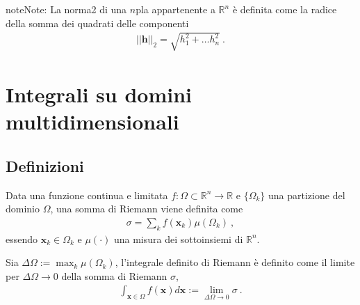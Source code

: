 \documentclass[letterpaper,10pt,english]{jupyterBook}
\begin{document}
\begin{sphinxadmonition}{note}{Note:}
\sphinxAtStartPar
{}
La norma\sphinxhyphen{}2 di una \(n\)\sphinxhyphen{}pla appartenente a \(\mathbb{R}^n\) è definita come la radice della somma dei quadrati delle componenti
\begin{equation*}
\begin{split}||\mathbf{h}||_{2} = \sqrt{h_1^2 + \dots h_n^2} \ .\end{split}
\end{equation*}\end{sphinxadmonition}

\sphinxstepscope


\section{Integrali su domini multi\sphinxhyphen{}dimensionali}
\label{\detokenize{ch/multivariable-calculus/integrals:integrali-su-domini-multi-dimensionali}}\label{\detokenize{ch/multivariable-calculus/integrals:multivariable-calculus-integrals}}\label{\detokenize{ch/multivariable-calculus/integrals::doc}}

\subsection{Definizioni}
\label{\detokenize{ch/multivariable-calculus/integrals:definizioni}}
\sphinxAtStartPar
{} Data una funzione continua e limitata \(f: \Omega \subset \mathbb{R}^n \rightarrow \mathbb{R}\) e \(\{ \Omega_k \}\) una partizione del dominio \(\Omega\), una somma di Riemann viene definita come
\begin{equation*}
\begin{split}\sigma = \sum_{k} f(\mathbf{x}_k) \mu(\Omega_k) \ ,\end{split}
\end{equation*}
\sphinxAtStartPar
essendo \(\mathbf{x}_k \in \Omega_k\) e \(\mu(\cdot)\) una misura dei sottoinsiemi di \(\mathbb{R}^n\).

\sphinxAtStartPar
{} Sia \(\Delta \Omega := \max_k \mu(\Omega_k)\), l’integrale definito di Riemann è definito come il limite per \(\Delta \Omega \rightarrow 0\) della somma di Riemann \(\sigma\),
\begin{equation*}
\begin{split}\int_{\mathbf{x} \in \Omega} f(\mathbf{x}) d \mathbf{x} := \lim_{\Delta \Omega \rightarrow 0} \sigma \ .\end{split}
\end{equation*}
\end{document}
